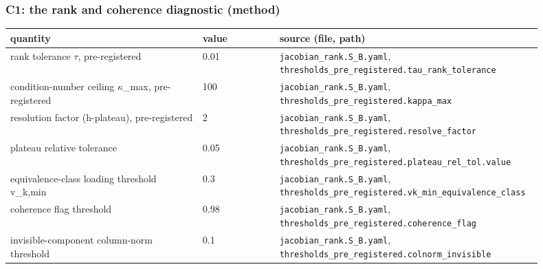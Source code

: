 
\subsubsection*{C1: the rank and coherence diagnostic (method)}
\begin{longtable}{p{0.35\linewidth} p{0.14\linewidth} p{0.41\linewidth}}
\toprule
quantity & value & source (file, path) \\
\midrule
\endhead
rank tolerance $\tau$, pre-registered & 0.01 & \texttt{\footnotesize jacobian\_\allowbreak{}rank.\allowbreak{}S\_\allowbreak{}B.\allowbreak{}yaml}, \texttt{\footnotesize thresholds\_\allowbreak{}pre\_\allowbreak{}registered.\allowbreak{}tau\_\allowbreak{}rank\_\allowbreak{}tolerance} \\
condition-number ceiling $\kappa$\_max, pre-registered & 100 & \texttt{\footnotesize jacobian\_\allowbreak{}rank.\allowbreak{}S\_\allowbreak{}B.\allowbreak{}yaml}, \texttt{\footnotesize thresholds\_\allowbreak{}pre\_\allowbreak{}registered.\allowbreak{}kappa\_\allowbreak{}max} \\
resolution factor (h-plateau), pre-registered & 2 & \texttt{\footnotesize jacobian\_\allowbreak{}rank.\allowbreak{}S\_\allowbreak{}B.\allowbreak{}yaml}, \texttt{\footnotesize thresholds\_\allowbreak{}pre\_\allowbreak{}registered.\allowbreak{}resolve\_\allowbreak{}factor} \\
plateau relative tolerance & 0.05 & \texttt{\footnotesize jacobian\_\allowbreak{}rank.\allowbreak{}S\_\allowbreak{}B.\allowbreak{}yaml}, \texttt{\footnotesize thresholds\_\allowbreak{}pre\_\allowbreak{}registered.\allowbreak{}plateau\_\allowbreak{}rel\_\allowbreak{}tol.\allowbreak{}value} \\
equivalence-class loading threshold v\_k,min & 0.3 & \texttt{\footnotesize jacobian\_\allowbreak{}rank.\allowbreak{}S\_\allowbreak{}B.\allowbreak{}yaml}, \texttt{\footnotesize thresholds\_\allowbreak{}pre\_\allowbreak{}registered.\allowbreak{}vk\_\allowbreak{}min\_\allowbreak{}equivalence\_\allowbreak{}class} \\
coherence flag threshold & 0.98 & \texttt{\footnotesize jacobian\_\allowbreak{}rank.\allowbreak{}S\_\allowbreak{}B.\allowbreak{}yaml}, \texttt{\footnotesize thresholds\_\allowbreak{}pre\_\allowbreak{}registered.\allowbreak{}coherence\_\allowbreak{}flag} \\
invisible-component column-norm threshold & 0.1 & \texttt{\footnotesize jacobian\_\allowbreak{}rank.\allowbreak{}S\_\allowbreak{}B.\allowbreak{}yaml}, \texttt{\footnotesize thresholds\_\allowbreak{}pre\_\allowbreak{}registered.\allowbreak{}colnorm\_\allowbreak{}invisible} \\

\end{longtable}
